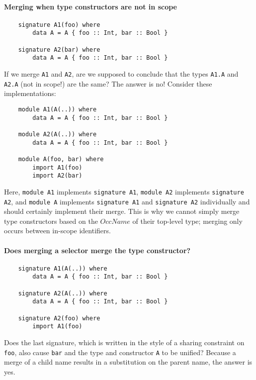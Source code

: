 \documentclass{article}
\newcommand{\I}[1]{\ensuremath{\mathit{#1}}}
\begin{document}
\paragraph{Merging when type constructors are not in scope}

\begin{verbatim}
    signature A1(foo) where
        data A = A { foo :: Int, bar :: Bool }

    signature A2(bar) where
        data A = A { foo :: Int, bar :: Bool }
\end{verbatim}
%
If we merge \verb|A1| and \verb|A2|, are we supposed to conclude that
the types \verb|A1.A| and \verb|A2.A| (not in scope!) are the same?
The answer is no!  Consider these implementations:

\begin{verbatim}
    module A1(A(..)) where
        data A = A { foo :: Int, bar :: Bool }

    module A2(A(..)) where
        data A = A { foo :: Int, bar :: Bool }

    module A(foo, bar) where
        import A1(foo)
        import A2(bar)
\end{verbatim}

Here, \verb|module A1| implements \verb|signature A1|, \verb|module A2| implements \verb|signature A2|,
and \verb|module A| implements \verb|signature A1| and \verb|signature A2| individually
and should certainly implement their merge.  This is why we cannot simply
merge type constructors based on the \I{OccName} of their top-level type;
merging only occurs between in-scope identifiers.

\paragraph{Does merging a selector merge the type constructor?}

\begin{verbatim}
    signature A1(A(..)) where
        data A = A { foo :: Int, bar :: Bool }

    signature A2(A(..)) where
        data A = A { foo :: Int, bar :: Bool }

    signature A2(foo) where
        import A1(foo)
\end{verbatim}
%
Does the last signature, which is written in the style of a sharing constraint on \verb|foo|,
also cause \verb|bar| and the type and constructor \verb|A| to be unified?
Because a merge of a child name results in a substitution on the parent name,
the answer is yes.
\end{document}
